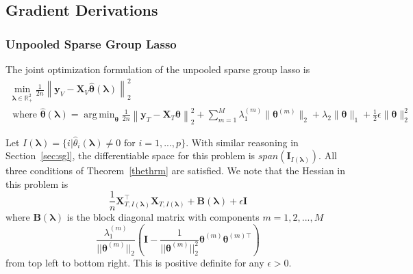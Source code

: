 \documentclass[10pt,letterpaper]{article}
\DeclareMathOperator*{\argmin}{arg\,min}
\begin{document}
\subsection{Gradient Derivations}

\subsubsection{Unpooled Sparse Group Lasso}

The joint optimization formulation of the unpooled sparse group lasso is
\begin{equation}
\begin{array}{c}
\min_{\boldsymbol{\lambda} \in \mathbb{R}^2_{+}} \frac{1}{2n}
\left \| \boldsymbol{y}_V - \boldsymbol{X}_V \hat{\boldsymbol{\theta}}(\boldsymbol{\lambda}) \right \|^2_2 \\
\text{ where }
\hat{\boldsymbol{\theta}}(\boldsymbol{\lambda}) =
\argmin_{\boldsymbol{\theta}} \frac{1}{2n} 
\left \| \boldsymbol{y}_T - \boldsymbol{X}_T \boldsymbol{\theta} \right \|^2_2
+ \sum_{m=1}^M \lambda_1^{(m)} \| \boldsymbol\theta^{(m)} \|_2
+ \lambda_2 \| \boldsymbol\theta \|_1
+ \frac{1}{2} \epsilon \| \boldsymbol\theta \|_2^2
\end{array}
\label{eq:unpooledJointOpt}
\end{equation}

Let $I(\boldsymbol \lambda) = \{i | \hat \theta_i(\boldsymbol \lambda) \ne 0  \text{ for } i=1,...,p \}$. With similar reasoning in Section~\ref{sec:sgl}, the differentiable space for this problem is $span(\boldsymbol I_{I(\boldsymbol \lambda)})$. All three conditions of Theorem~\ref{thethrm} are satisfied. We note that the Hessian in this problem is
\begin{equation}
\frac{1}{n} \boldsymbol X_{T, I(\boldsymbol \lambda)}^\top \boldsymbol X_{T, I(\boldsymbol \lambda)} + \boldsymbol B(\boldsymbol \lambda) + \epsilon \boldsymbol I
\end{equation}
where $\boldsymbol B(\boldsymbol \lambda)$ is the block diagonal matrix with components  $m=1,2,...,M$
\begin{equation}
\frac{\lambda_1^{(m)}}{|| \boldsymbol \theta^{(m)}||_2}
\left (
\boldsymbol I - 
\frac{1}{|| \boldsymbol \theta^{(m)}||_2^2} \boldsymbol \theta^{(m)} \boldsymbol \theta^{(m) \top}
\right )
\end{equation}
from top left to bottom right. This is positive definite for any $\epsilon > 0$.
\end{document}
